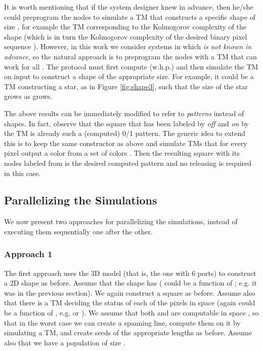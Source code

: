 \documentclass[oribibl, 11pt]{llncs}
\begin{document}
\begin{remark}
It is worth mentioning that if the system designer knew  in advance, then he/she could preprogram the nodes to simulate a TM that constructs a specific shape of size , for example the TM corresponding to the Kolmogorov complexity of the shape (which is in turn the Kolmogorov complexity of the desired binary pixel sequence ). However, in this work we consider systems in which  \emph{is not known in advance}, so the natural approach is to preprogram the nodes with a TM that can work for all . The protocol must first compute  (w.h.p.) and then simulate the TM on input  to construct a shape of the appropriate size. For example, it could be a TM constructing a star, as in Figure \ref{fig:shape3}, such that the size of the star grows as  grows.   
\end{remark}

\begin{remark}
The above results can be immediately modified to refer to \emph{patterns} instead of shapes. In fact, observe that the  square that has been labeled by \emph{off} and \emph{on} by the TM is already such a (computed) 0/1 pattern. The generic idea to extend this is to keep the same constructor as above and simulate TMs that for every pixel output a color from a set of colors . Then the resulting square with its nodes labeled from  is the desired computed pattern and no releasing is required in this case.
\end{remark}

\subsection{Parallelizing the Simulations}
\label{subsec:parsim}

We now present two approaches for parallelizing the simulations, instead of executing them sequentially one after the other.

\subsubsection{Approach 1}

The first approach uses the 3D model (that is, the one with 6 ports) to construct a 2D shape as before. Assume that the shape  has  ( could be a function of ; e.g. it was  in the previous section). We again construct a  square as before. Assume also that there is a TM  deciding the status of each of the pixels in space  (again could be a function of , e.g.  or ). We assume that both  and  are computable in space , so that in the worst case we can create a spanning line, compute them on it by simulating a TM, and create seeds of the appropriate lengths as before. Assume also that we have a population of size .
\end{document}
